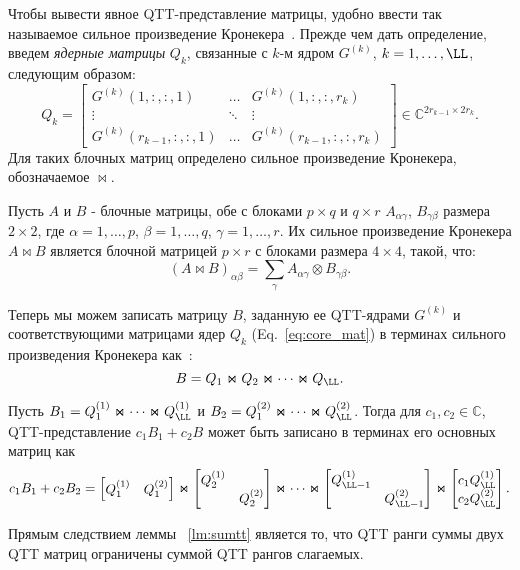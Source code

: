 Чтобы вывести явное QTT-представление матрицы, удобно ввести так называемое сильное произведение Кронекера~\cite{khkaz-lap-2012}.
Прежде чем дать определение, введем \emph{ядерные матрицы} $Q_k$, связанные с $k$-м ядром $G^{(k)}$, $k=1,\dots,\LL$, следующим образом:
\begin{equation}\label{eq:core_mat}
Q_k = 
\begin{bmatrix}
G^{(k)}(1, :, :, 1) & \dots & G^{(k)}(1, :, :, r_k) \\
\vdots & \ddots & \vdots \\
G^{(k)}(r_{k-1}, :, :, 1) & \dots & G^{(k)}(r_{k-1}, :, :, r_k)
\end{bmatrix}
\in\mathbb{C}^{2r_{k-1} \times 2r_k}.
\end{equation}
Для таких блочных матриц определено сильное произведение Кронекера, обозначаемое $\Join$.
\begin{definition}
	Пусть $A$ и $B$ - блочные матрицы, обе с блоками $p\times q$ и $q\times r$ $A_{\alpha\gamma}$, $B_{\gamma\beta}$ размера $2\times 2$, где $\alpha=1,\dots,p$, $\beta=1,\dots,q$, $\gamma=1,\dots,r$. Их сильное произведение Кронекера $A\Join B$ является блочной матрицей $p\times r$ с блоками размера $4\times 4$, такой, что:
	\[
	(A\Join B)_{\alpha\beta} = \sum_{\gamma} A_{\alpha\gamma} \otimes B_{\gamma \beta}.
	\]
\end{definition}
Теперь мы можем записать матрицу $B$, заданную ее QTT-ядрами $G^{(k)}$ и соответствующими матрицами ядер $Q_k$ (Eq.~\eqref{eq:core_mat}) в терминах сильного произведения Кронекера как~\cite{khkaz-lap-2012}:
\[
B = Q_1 \Join Q_2 \Join \dots \Join Q_\LL.
\]

\begin{lemma} \label{lm:sumtt}
	Пусть $B_1 = Q_1^{(1)} \Join \dots \Join Q_\LL^{(1)}$ и $B_2 = Q_1^{(2)} \Join \dots \Join Q_\LL^{(2)}$. Тогда для $c_1,c_2\in\mathbb{C}$, QTT-представление $c_1 B_1 + c_2 B$ может быть записано в терминах его основных матриц как
	\[
	c_1 B_1 + c_2 B_2 = 
	\begin{bmatrix}
	Q_1^{(1)} & Q_1^{(2)}
	\end{bmatrix}
	\Join 
	\begin{bmatrix}
	Q_2^{(1)} \\ & Q_2^{(2)}
	\end{bmatrix}
	\Join 
	\dots 
	\Join
	\begin{bmatrix}
	Q_{\LL-1}^{(1)} \\ & Q_{\LL-1}^{(2)}
	\end{bmatrix}
	\Join
	\begin{bmatrix}
	c_1 Q_\LL^{(1)} \\  c_2 Q_\LL^{(2)}
	\end{bmatrix}.
	\]
\end{lemma}
Прямым следствием леммы ~\ref{lm:sumtt} является то, что QTT ранги суммы двух QTT матриц ограничены суммой QTT рангов слагаемых.

